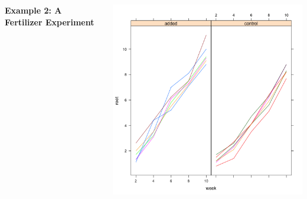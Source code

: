 \documentclass{beamer}
\begin{document}
\begin{frame}[fragile]{}
\begin{columns}
    \begin{column}{0.4\textwidth}
        \huge\textbf{Example 2: A Fertilizer Experiment}
    \end{column}
    \begin{column}{0.6\textwidth}
        \includegraphics[width=\textwidth]{lectures/day_4_GLS/figures/unnamed-chunk-30-1.png}
    \end{column}
\end{columns}
\end{frame}
\end{document}
